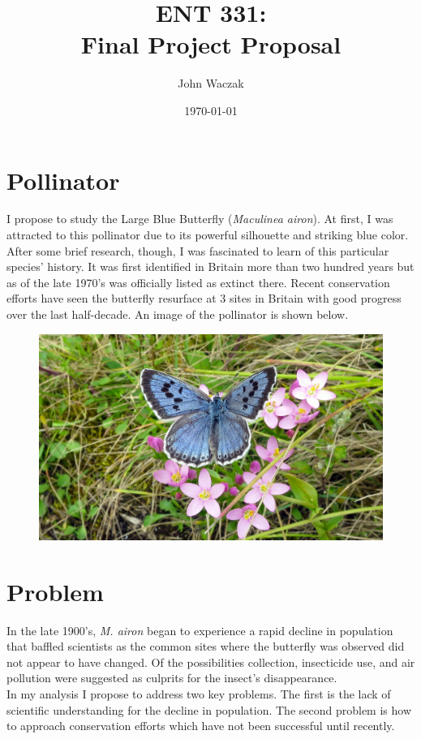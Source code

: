 \documentclass[12pt, twocolumn, letterpaper]{article}
\title{ENT 331: \\
  Final Project Proposal}
\author{John Waczak}
\date{\today}
\begin{document}
\maketitle 

\section*{Pollinator}
I propose to study the Large Blue Butterfly (\textit{Maculinea  airon}). At first, I was attracted to this pollinator due to its powerful silhouette and striking blue color. After some brief research, though, I was fascinated to learn of this particular species' history. It was first identified in Britain more than two hundred years but as of the late 1970's was officially listed as extinct there. Recent conservation efforts have seen the butterfly resurface at 3 sites in Britain with good progress over the last half-decade. An image of the pollinator is shown below.

\begin{figure}[!hbt]
  \centering
  \includegraphics[width=1\columnwidth]{large_blue_1}
\end{figure}

\section*{Problem}
In the late 1900's, \textit{M. airon} began to experience a rapid decline in population that baffled scientists as the common sites where the butterfly was observed did not appear to have changed. Of the possibilities collection, insecticide use, and air pollution were suggested as culprits for the insect's disappearance.   \\

In my analysis I propose to address two key problems. The first is the lack of scientific understanding for the decline in population. The second problem is how to approach conservation efforts which have not been successful until recently. 
\end{document}
